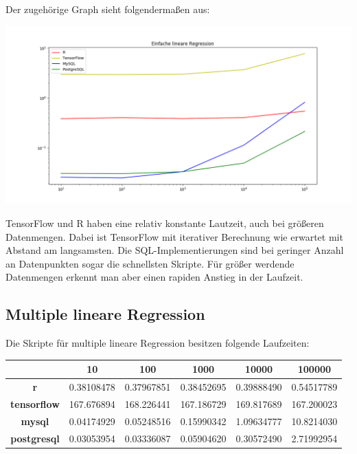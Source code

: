 Der zugehörige Graph sieht folgendermaßen aus:

\includegraphics[width=\textwidth]{simpleLinearRegressionBenchmark}

TensorFlow und R haben eine relativ konstante Lautzeit, auch bei größeren Datenmengen. Dabei ist TensorFlow mit iterativer Berechnung wie erwartet mit Abstand am langsamsten. Die SQL-Implementierungen sind bei geringer Anzahl an Datenpunkten sogar die schnellsten Skripte. Für größer werdende Datenmengen erkennt man aber einen rapiden Anstieg in der Laufzeit.

\subsection{Multiple lineare Regression}
\label{subsection:4:1:2}

Die Skripte für multiple lineare Regression besitzen folgende Laufzeiten:

\begin{center}
  \begin{tabular}{|c|c|c|c|c|c|}\hline
    & \textbf{10} & \textbf{100} & \textbf{1000} & \textbf{10000} & \textbf{100000} \\ \hline
    \textbf{r} & 0.38108478 & 0.37967851 & 0.38452695 & 0.39888490 & 0.54517789 \\ \hline
    \textbf{tensorflow} & 167.676894 & 168.226441 & 167.186729 & 169.817689 & 167.200023 \\ \hline
    \textbf{mysql} & 0.04174929 & 0.05248516 & 0.15990342 & 1.09634777 & 10.8214030 \\ \hline
    \textbf{postgresql} & 0.03053954 & 0.03336087 & 0.05904620 & 0.30572490 & 2.71992954 \\ \hline
  \end{tabular}
\end{center}

